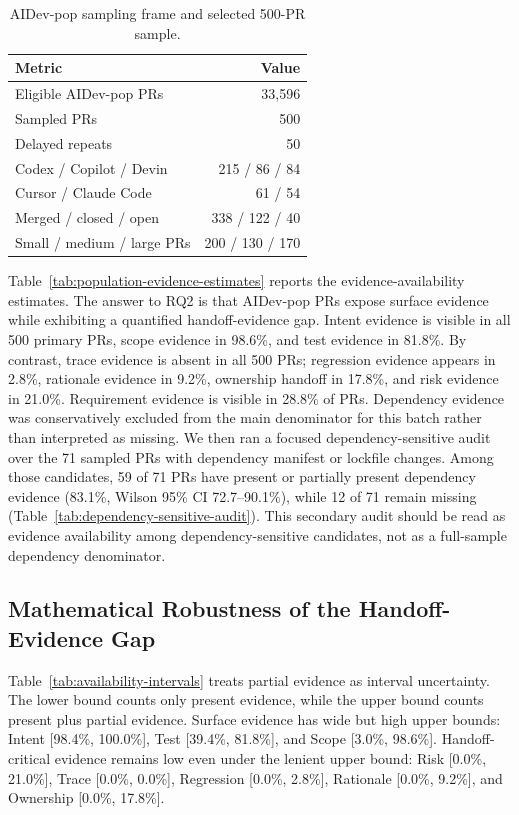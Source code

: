 \documentclass[10pt,conference]{IEEEtran}
\begin{document}
\begin{table}[t]
\centering
\caption{AIDev-pop sampling frame and selected 500-PR sample.}
\label{tab:population-sample}
\footnotesize
\begin{tabular}{@{}L{0.48\columnwidth}r@{}}
\toprule
Metric & Value \\
\midrule
Eligible AIDev-pop PRs & 33,596 \\
Sampled PRs & 500 \\
Delayed repeats & 50 \\
Codex / Copilot / Devin & 215 / 86 / 84 \\
Cursor / Claude Code & 61 / 54 \\
Merged / closed / open & 338 / 122 / 40 \\
Small / medium / large PRs & 200 / 130 / 170 \\
\bottomrule
\end{tabular}
\end{table}

Table~\ref{tab:population-evidence-estimates} reports the evidence-availability estimates.
The answer to RQ2 is that AIDev-pop PRs expose surface evidence while exhibiting a quantified handoff-evidence gap.
Intent evidence is visible in all 500 primary PRs, scope evidence in 98.6\%, and test evidence in 81.8\%.
By contrast, trace evidence is absent in all 500 PRs; regression evidence appears in 2.8\%, rationale evidence in 9.2\%, ownership handoff in 17.8\%, and risk evidence in 21.0\%.
Requirement evidence is visible in 28.8\% of PRs.
Dependency evidence was conservatively excluded from the main denominator for this batch rather than interpreted as missing.
We then ran a focused dependency-sensitive audit over the 71 sampled PRs with dependency manifest or lockfile changes.
Among those candidates, 59 of 71 PRs have present or partially present dependency evidence (83.1\%, Wilson 95\% CI 72.7--90.1\%), while 12 of 71 remain missing (Table~\ref{tab:dependency-sensitive-audit}).
This secondary audit should be read as evidence availability among dependency-sensitive candidates, not as a full-sample dependency denominator.

\subsection{Mathematical Robustness of the Handoff-Evidence Gap}

Table~\ref{tab:availability-intervals} treats partial evidence as interval uncertainty.
The lower bound counts only present evidence, while the upper bound counts present plus partial evidence.
Surface evidence has wide but high upper bounds: Intent [98.4\%, 100.0\%], Test [39.4\%, 81.8\%], and Scope [3.0\%, 98.6\%].
Handoff-critical evidence remains low even under the lenient upper bound: Risk [0.0\%, 21.0\%], Trace [0.0\%, 0.0\%], Regression [0.0\%, 2.8\%], Rationale [0.0\%, 9.2\%], and Ownership [0.0\%, 17.8\%].
\end{document}
